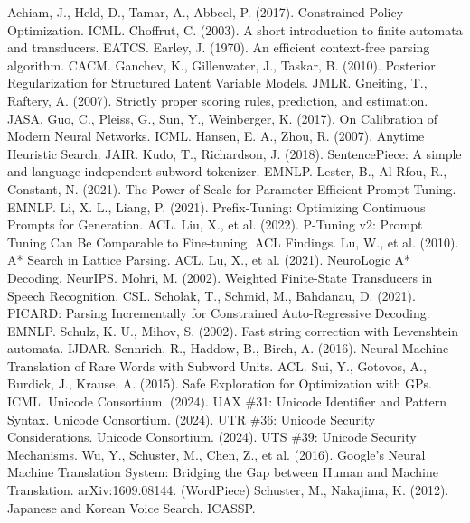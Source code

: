 \documentclass{article}
\begin{document}
\begin{thebibliography}{99}
Achiam, J., Held, D., Tamar, A., Abbeel, P. (2017). Constrained Policy Optimization. ICML.
Choffrut, C. (2003). A short introduction to finite automata and transducers. EATCS.
Earley, J. (1970). An efficient context-free parsing algorithm. CACM.
Ganchev, K., Gillenwater, J., Taskar, B. (2010). Posterior Regularization for Structured Latent Variable Models. JMLR.
Gneiting, T., Raftery, A. (2007). Strictly proper scoring rules, prediction, and estimation. JASA.
Guo, C., Pleiss, G., Sun, Y., Weinberger, K. (2017). On Calibration of Modern Neural Networks. ICML.
Hansen, E. A., Zhou, R. (2007). Anytime Heuristic Search. JAIR.
Kudo, T., Richardson, J. (2018). SentencePiece: A simple and language independent subword tokenizer. EMNLP.
Lester, B., Al-Rfou, R., Constant, N. (2021). The Power of Scale for Parameter-Efficient Prompt Tuning. EMNLP.
Li, X. L., Liang, P. (2021). Prefix-Tuning: Optimizing Continuous Prompts for Generation. ACL.
Liu, X., et al. (2022). P-Tuning v2: Prompt Tuning Can Be Comparable to Fine-tuning. ACL Findings.
Lu, W., et al. (2010). A* Search in Lattice Parsing. ACL.
Lu, X., et al. (2021). NeuroLogic A* Decoding. NeurIPS.
Mohri, M. (2002). Weighted Finite-State Transducers in Speech Recognition. CSL.
Scholak, T., Schmid, M., Bahdanau, D. (2021). PICARD: Parsing Incrementally for Constrained Auto-Regressive Decoding. EMNLP.
Schulz, K. U., Mihov, S. (2002). Fast string correction with Levenshtein automata. IJDAR.
Sennrich, R., Haddow, B., Birch, A. (2016). Neural Machine Translation of Rare Words with Subword Units. ACL.
Sui, Y., Gotovos, A., Burdick, J., Krause, A. (2015). Safe Exploration for Optimization with GPs. ICML.
Unicode Consortium. (2024). UAX \#31: Unicode Identifier and Pattern Syntax.
Unicode Consortium. (2024). UTR \#36: Unicode Security Considerations.
Unicode Consortium. (2024). UTS \#39: Unicode Security Mechanisms.
Wu, Y., Schuster, M., Chen, Z., et al. (2016). Google's Neural Machine Translation System: Bridging the Gap between Human and Machine Translation. arXiv:1609.08144. (WordPiece)
Schuster, M., Nakajima, K. (2012). Japanese and Korean Voice Search. ICASSP.
\end{thebibliography}
\end{document}

